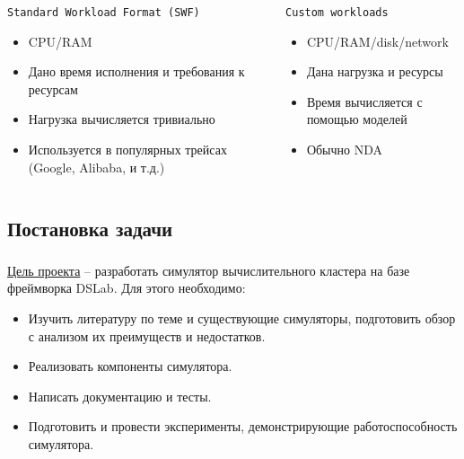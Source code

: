 \documentclass[t]{beamer}  %
\begin{document}
    \begin{frame}[fragile]
    \frametitle{\insertsection} 
	\framesubtitle{\insertsubsection}
	
			\vspace{0.5cm}
	\begin{columns}[t]
		\begin{column}{0.55\textwidth}
			{\centering \small\texttt{Standard Workload Format (SWF)}}
			\vspace{0.3cm}
			\begin{itemize}
				\item<1-> CPU/RAM 
				\item<2-> Дано время исполнения и требования к ресурсам
				\item<2-> Нагрузка вычисляется тривиально
				\item<3-> Используется в популярных трейсах (Google, Alibaba, и т.д.)
			\end{itemize}
						
		\end{column}
		\begin{column}{0.5\textwidth}
			{\centering  \small\texttt{Custom workloads}}
			\vspace{0.3cm}
			\begin{itemize}
				\item<1-> CPU/RAM/disk/network 
				\item<2-> Дана нагрузка и ресурсы
				\item<2-> Время вычисляется с помощью моделей
				\item<3-> Обычно NDA
			\end{itemize}
		\end{column}
	\end{columns}


    \end{frame}




	

	 
	\subsection{Постановка задачи}
	\begin{frame}[fragile]
		\frametitle{\insertsection} 
		\framesubtitle{\insertsubsection}
		\vspace{0.5cm}
		\underline{Цель проекта} -- разработать симулятор вычислительного кластера на базе фреймворка DSLab. Для этого необходимо:
		\begin{itemize}
			\item Изучить литературу по теме и существующие симуляторы, подготовить обзор с анализом
			их преимуществ и недостатков.
			\item Реализовать компоненты симулятора.
			\item Написать документацию и тесты.
			\item Подготовить и провести эксперименты, демонстрирующие работоспособность симулятора.
		\end{itemize}
	\end{frame}
\end{document}
